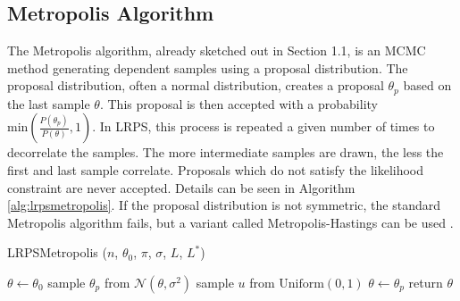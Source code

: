 \documentclass[12pt, a4paper]{report}
\begin{document}
\subsection{Metropolis Algorithm}
The Metropolis algorithm, already sketched out in Section 1.1, is an MCMC method generating dependent samples using a proposal distribution.
The proposal distribution, often a normal distribution, creates a proposal $\theta_p$ based on the last sample $\theta$.
This proposal is then accepted with a probability $\textrm{min}\left(\frac{P(\theta_p)}{P(\theta)}, 1\right)$.
In LRPS, this process is repeated a given number of times to decorrelate the samples.
The more intermediate samples are drawn, the less the first and last sample correlate.
Proposals which do not satisfy the likelihood constraint are never accepted.
Details can be seen in Algorithm \ref{alg:lrpsmetropolis}.
If the proposal distribution is not symmetric, the standard Metropolis algorithm fails, but a variant called Metropolis-Hastings can be used \cite[p. 365f.]{mckay}.
\begin{algorithm}
    \caption[Likelihood-restricted prior sampling using Metropolis.]{LRPSMetropolis ($n$, $\theta_0$, $\pi$, $\sigma$, $L$, $L^*$)}
    \label{alg:lrpsmetropolis}
    \begin{algorithmic}
        \State $\theta \gets \theta_0$
            \State sample $\theta_p$ from $\mathcal{N}(\theta, \sigma^2)$
            \State sample $u$ from $\textrm{Uniform}(0, 1)$
                \State $\theta \gets \theta_p$
            \EndIf
        \EndFor
        \State return $\theta$
    \end{algorithmic}
\end{algorithm}
\end{document}
